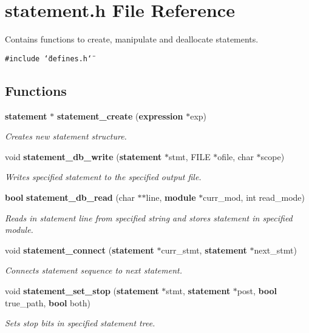 \section{statement.h File Reference}
\label{statement_8h}
Contains functions to create, manipulate and deallocate statements.  


{\tt \#include \char`\"{}defines.h\char`\"{}}\par
\subsection*{Functions}
\begin{CompactItemize}
\item 
{\bf statement} $\ast$ {\bf statement\_\-create} ({\bf expression} $\ast$exp)
\begin{CompactList}\small\item\em Creates new statement structure. \item\end{CompactList}\item 
void {\bf statement\_\-db\_\-write} ({\bf statement} $\ast$stmt, FILE $\ast$ofile, char $\ast$scope)
\begin{CompactList}\small\item\em Writes specified statement to the specified output file. \item\end{CompactList}\item 
{\bf bool} {\bf statement\_\-db\_\-read} (char $\ast$$\ast$line, {\bf module} $\ast$curr\_\-mod, int read\_\-mode)
\begin{CompactList}\small\item\em Reads in statement line from specified string and stores statement in specified module. \item\end{CompactList}\item 
void {\bf statement\_\-connect} ({\bf statement} $\ast$curr\_\-stmt, {\bf statement} $\ast$next\_\-stmt)
\begin{CompactList}\small\item\em Connects statement sequence to next statement. \item\end{CompactList}\item 
void {\bf statement\_\-set\_\-stop} ({\bf statement} $\ast$stmt, {\bf statement} $\ast$post, {\bf bool} true\_\-path, {\bf bool} both)
\begin{CompactList}\small\item\em Sets stop bits in specified statement tree. \item\end{CompactList}\item 
$$
\end{CompactItemize}
